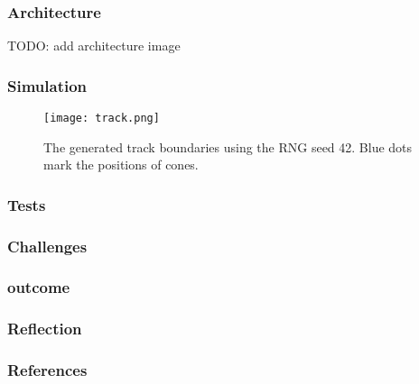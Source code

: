 \documentclass{beamer}
\begin{document}
\begin{frame}
	\frametitle{Architecture}
	TODO: add architecture image
\end{frame}

\begin{frame}
	\frametitle{Simulation}
	\begin{figure}[ht]
		\vskip 0.2in
		\begin{center}
			\centerline{\texttt{[image: track.png]}}
			\caption{The generated track boundaries using the RNG seed 42. Blue dots mark the positions of cones.}
			\label{fig:track}
		\end{center}
		\vskip -0.2in
	\end{figure}
\end{frame}

\begin{frame}
	\frametitle{Tests}
\end{frame}

\begin{frame}
	\frametitle{Challenges}
\end{frame}

\begin{frame}
	\frametitle{outcome}
\end{frame}

\begin{frame}
	\frametitle{Reflection}
\end{frame}

\begin{frame}
	\frametitle{References}
\end{frame}
\end{document}
